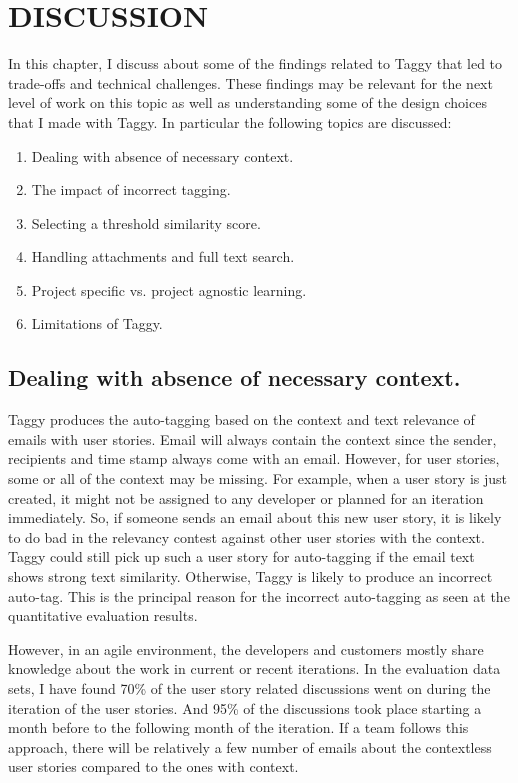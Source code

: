 \fancyhead[RO,LE]{\thepage}
\fancyfoot{} 
\chapter{DISCUSSION}
In this chapter, I discuss about some of the findings related to Taggy that led to trade-offs and technical challenges. These findings may be relevant for the next level of work on this topic as well as understanding some of the design choices that I made with Taggy. In particular the following topics are discussed:

\begin{enumerate}
	\item Dealing with absence of necessary context.
	\item The impact of incorrect tagging.
	\item Selecting a threshold similarity score.	
	\item Handling attachments and full text search.	
	\item Project specific vs. project agnostic learning.
	\item Limitations of Taggy.
\end{enumerate}

\section{Dealing with absence of necessary context.}
Taggy produces the auto-tagging based on the context and text relevance of emails with user stories. Email will always contain the context since the sender, recipients and time stamp always come with an email. However, for user stories, some or all of the context may be missing. For example, when a user story is just created, it might not be assigned to any developer or planned for an iteration immediately. So, if someone sends an email about this new user story, it is likely to do bad in the relevancy contest against other user stories with the context. Taggy could still pick up such  a user story for auto-tagging if the email text shows strong text similarity. Otherwise, Taggy is likely to produce an incorrect auto-tag. This is the principal reason for the incorrect auto-tagging as seen at the quantitative evaluation results.

However, in an agile environment, the developers and customers mostly share knowledge about the work in current or recent iterations. In the evaluation data sets, I have found 70\% of the user story related discussions went on during the iteration of the user stories. And 95\% of the discussions took place starting a month before to the following month of the iteration. If a team follows this approach, there will be relatively a few number of emails about the contextless user stories compared to the ones with context.


